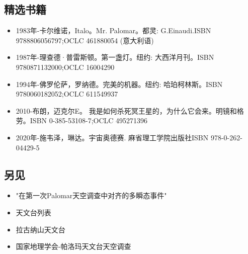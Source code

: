 \subsection{精选书籍}
\begin{itemize}
\item 1983年-卡尔维诺，Italo。Mr. Palomar。都灵: G.Einaudi.ISBN 9788806056797;OCLC 461880054 (意大利语)
\item 1987年-理查德·普雷斯顿。第一盏灯。纽约: 大西洋月刊。ISBN 9780871132000;OCLC 16004290
\item 1994年-佛罗伦萨，罗纳德。完美的机器。纽约: 哈珀柯林斯。ISBN 9780060182052;OCLC 611549937
\item 2010-布朗，迈克尔E。 我是如何杀死冥王星的，为什么它会来。明镜和格劳。ISBN 0-385-53108-7;OCLC 495271396
\item 2020年-施韦泽，琳达。宇宙奥德赛. 麻省理工学院出版社ISBN 978-0-262-04429-5
\end{itemize}
\subsection{另见}
\begin{itemize}
\item "在第一次Palomar天空调查中对齐的多瞬态事件"
\item 天文台列表
\item 拉古纳山天文台
\item 国家地理学会-帕洛玛天文台天空调查
\end{itemize}
